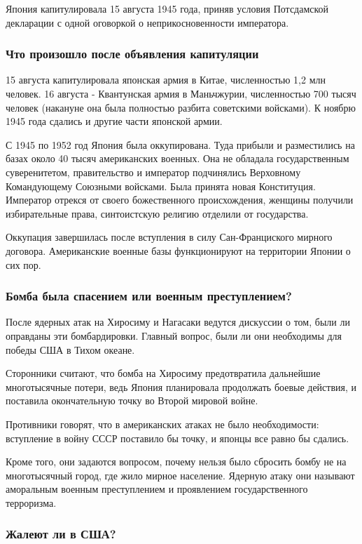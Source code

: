 Япония капитулировала 15 августа 1945 года, приняв условия Потсдамской
декларации с одной оговоркой о неприкосновенности императора.

\subsubsection{Что произошло после объявления капитуляции}

15 августа капитулировала японская армия в Китае, численностью 1,2 млн человек.
16 августа - Квантунская армия в Маньчжурии, численностью 700 тысяч человек
(накануне она была полностью разбита советскими войсками). К ноябрю 1945 года
сдались и другие части японской армии. 

С 1945 по 1952 год Япония была оккупирована. Туда прибыли и разместились на
базах около 40 тысяч американских военных. Она не обладала государственным
суверенитетом, правительство и император подчинялись Верховному Командующему
Союзными войсками. Была принята новая Конституция. Император отрекся от своего
божественного происхождения, женщины получили избирательные права, синтоистскую
религию отделили от государства.

Оккупация завершилась после вступления в силу Сан-Франциского мирного договора.
Американские военные базы функционируют на территории Японии о сих пор.

\subsubsection{Бомба была спасением или военным преступлением?}

После ядерных атак на Хиросиму и Нагасаки ведутся дискуссии о том, были ли
оправданы эти бомбардировки. Главный вопрос, были ли они необходимы для победы
США в Тихом океане.

Сторонники считают, что бомба на Хиросиму предотвратила дальнейшие
многотысячные потери, ведь Япония планировала продолжать боевые действия, и
поставила окончательную точку во Второй мировой войне.

Противники говорят, что в американских атаках не было необходимости: вступление
в войну СССР поставило бы точку, и японцы все равно бы сдались.

Кроме того, они задаются вопросом, почему нельзя было сбросить бомбу не на
многотысячный город, где жило мирное население. Ядерную атаку они называют
аморальным военным преступлением и проявлением государственного терроризма. 

\subsubsection{Жалеют ли в США?}

